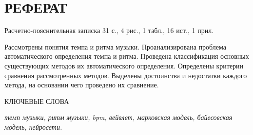 \section*{РЕФЕРАТ}

Расчетно-пояснительная записка 31 с., 4 рис., 1 табл., 16 ист., 1 прил.

Рассмотрены понятия темпа и ритма музыки. Проанализирована проблема автоматического определения темпа и ритма. Проведена классификация основных существующих методов их автоматического определения. Определены критерии сравнения рассмотренных методов. Выделены достоинства и недостатки каждого метода, на основании чего проведено их сравнение.

КЛЮЧЕВЫЕ СЛОВА

\textit{темп музыки, ритм музыки, bpm, вейвлет, марковская модель, байесовская модель, нейросети.}

\clearpage